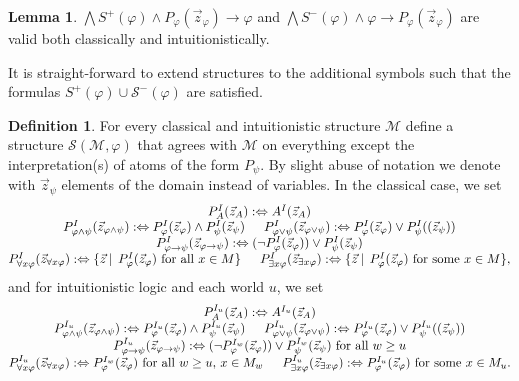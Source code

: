 \documentclass[a4paper,12pt]{report}
\theoremstyle{definition}
\theoremstyle{definition}
\theoremstyle{definition}
\newtheorem{lemma}[theorem]{Lemma}
\theoremstyle{definition}
\theoremstyle{definition}
\newtheorem{definition}[theorem]{Definition}
\theoremstyle{definition}
\theoremstyle{definition}
\begin{document}
	\begin{lemma}
		$\bigwedge S^+(\varphi)\wedge P_\varphi(\vec z_\varphi)\to\varphi$ and $\bigwedge S^-(\varphi)\wedge \varphi\to P_\varphi(\vec z_\varphi)$ are valid both classically and intuitionistically.
	\end{lemma}
	
	It is straight-forward to extend structures to the additional symbols such that the formulas $S^+(\varphi)\cup\mathcal S^-(\varphi)$ are satisfied.
	\begin{definition}
		For every classical and intuitionistic structure $\mathcal M$ define a structure $\mathcal S(\mathcal M,\varphi)$ that agrees with $\mathcal M$ on everything except the interpretation(s) of atoms of the form $P_\psi$. By slight abuse of notation we denote with $\vec z_\psi$ elements of the domain instead of variables. In the classical case, we set
		$$\begin{matrix}
			P_A^I(\vec z_A):\Leftrightarrow A^I(\vec z_A)\\
			P_{\varphi\wedge\psi}^I(\vec z_{\varphi\wedge\psi}) :\Leftrightarrow P_{\varphi}^I(\vec z_\varphi)\wedge P_{\psi}^I(\vec z_\psi)\indent P_{\varphi\vee\psi}^I(\vec z_{\varphi\vee\psi}) :\Leftrightarrow P_{\varphi}^I(\vec z_\varphi)\vee P_{\psi}^I((\vec z_\psi))\\P_{\varphi\to\psi}^I(\vec z_{\varphi\to\psi}) :\Leftrightarrow (\neg P_{\varphi}^I(\vec z_{\varphi}))\vee P_{\psi}^I(\vec z_{\psi})\\P_{\forall x\varphi}^I(\vec z_{\forall x\varphi}) :\Leftrightarrow \{\vec z\:|\:\:P_{\varphi}^I(\vec z_\varphi) \text{ for all $x\in M$}\}\indent P_{\exists x\varphi}^I(\vec z_{\exists x\varphi}) :\Leftrightarrow \{\vec z\:|\:\:P_{\varphi}^I(\vec z_\varphi) \text{ for some $x\in M$}\},
		\end{matrix}$$
		and for intuitionistic logic and each world $u$, we set
		$$\begin{matrix}
			P_A^{I_u}(\vec z_A):\Leftrightarrow A^{I_u}(\vec z_A)\\
			P_{\varphi\wedge\psi}^{I_u}(\vec z_{\varphi\wedge\psi}) :\Leftrightarrow P_{\varphi}^{I_u}(\vec z_\varphi)\wedge P_{\psi}^{I_u}(\vec z_\psi)\indent P_{\varphi\vee\psi}^{I_u}(\vec z_{\varphi\vee\psi}) :\Leftrightarrow P_{\varphi}^{I_u}(\vec z_\varphi)\vee P_{\psi}^{I_u}((\vec z_\psi))\\
			P_{\varphi\to\psi}^{I_u}(\vec z_{\varphi\to\psi}) :\Leftrightarrow(\neg P_{\varphi}^{I_w}(\vec z_{\varphi}))\vee P_{\psi}^{I_w}(\vec z_{\psi})\text{ for all $w\geq u$}\\
			P_{\forall x\varphi}^{I_u}(\vec z_{\forall x\varphi}) :\Leftrightarrow P_{\varphi}^{I_w}(\vec z_\varphi) \text{ for all $w\geq u$, $x\in M_w$}\indent P_{\exists x\varphi}^{I_u}(\vec z_{\exists x\varphi}) :\Leftrightarrow P_{\varphi}^{I_u}(\vec z_\varphi) \text{ for some $x\in M_u$}.
		\end{matrix}$$
	\end{definition}
\end{document}
